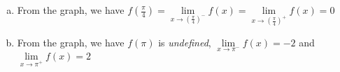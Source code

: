 \documentclass[11pt,letterpaper]{article}
\newcounter{problem}
\newcommand{\problem}{
	\stepcounter{problem}%
	\noindent \textbf{Problem \theproblem. }%
}
\begin{document}
\begin{enumerate}[(a)]
    \item From the graph, we have $f\left(\frac{\pi}{4}\right) = \lim\limits_{x \to  \left(\frac{\pi}{4}\right)^-} f(x) = \lim\limits_{x \to  \left(\frac{\pi}{4}\right)^+} f(x) = 0$
    \item From the graph, we have $f(\pi)$ is \textit{undefined}, $\lim\limits_{x \to  \pi^-} f(x) = -2$ and $\lim\limits_{x \to  \pi^+} f(x) = 2$
\end{enumerate}



\end{document}
